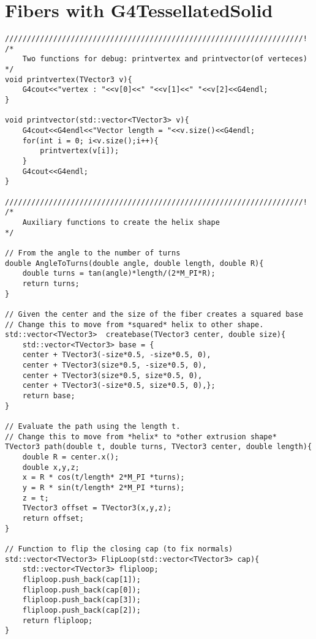 
\chapter{Fibers with G4TessellatedSolid}
\label{ch:G4TessellatedSolid}
\begin{lstlisting}
////////////////////////////////////////////////////////////////////!
/*
    Two functions for debug: printvertex and printvector(of verteces)
*/
void printvertex(TVector3 v){
    G4cout<<"vertex : "<<v[0]<<" "<<v[1]<<" "<<v[2]<<G4endl;
}

void printvector(std::vector<TVector3> v){
    G4cout<<G4endl<<"Vector length = "<<v.size()<<G4endl;
    for(int i = 0; i<v.size();i++){
        printvertex(v[i]);
    }
    G4cout<<G4endl;
}

////////////////////////////////////////////////////////////////////!
/*
    Auxiliary functions to create the helix shape
*/

// From the angle to the number of turns
double AngleToTurns(double angle, double length, double R){
    double turns = tan(angle)*length/(2*M_PI*R);
    return turns;
}

// Given the center and the size of the fiber creates a squared base
// Change this to move from *squared* helix to other shape.
std::vector<TVector3>  createbase(TVector3 center, double size){
    std::vector<TVector3> base = {
    center + TVector3(-size*0.5, -size*0.5, 0),
    center + TVector3(size*0.5, -size*0.5, 0),
    center + TVector3(size*0.5, size*0.5, 0),
    center + TVector3(-size*0.5, size*0.5, 0),};
    return base;
}

// Evaluate the path using the length t. 
// Change this to move from *helix* to *other extrusion shape*
TVector3 path(double t, double turns, TVector3 center, double length){
    double R = center.x();
    double x,y,z;
    x = R * cos(t/length* 2*M_PI *turns);
    y = R * sin(t/length* 2*M_PI *turns);
    z = t;
    TVector3 offset = TVector3(x,y,z);
    return offset;
}

// Function to flip the closing cap (to fix normals)
std::vector<TVector3> FlipLoop(std::vector<TVector3> cap){
    std::vector<TVector3> fliploop;
    fliploop.push_back(cap[1]);
    fliploop.push_back(cap[0]);
    fliploop.push_back(cap[3]);
    fliploop.push_back(cap[2]);
    return fliploop;
}


\end{lstlisting}
